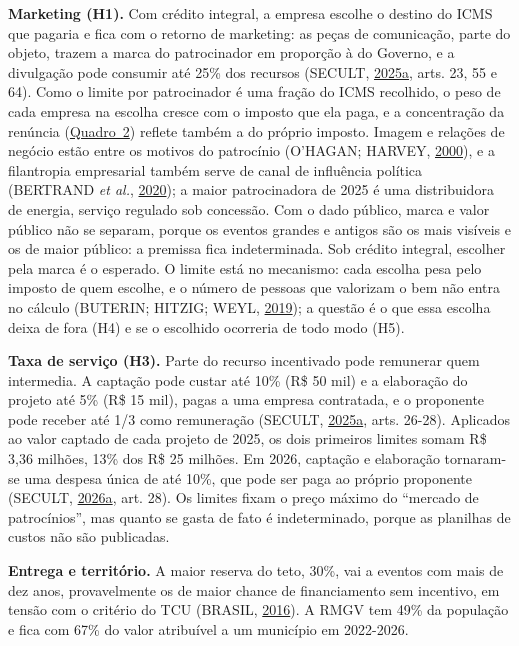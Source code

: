 \documentclass[12pt,a4paper]{article}
\begin{document}
\textbf{Marketing (H1).} Com crédito integral, a empresa escolhe o destino do ICMS que pagaria e
fica com o retorno de marketing: as peças de comunicação, parte do objeto, trazem a marca do
patrocinador em proporção à do Governo, e a divulgação pode consumir até 25\% dos recursos (SECULT,
\hyperref[ref-secult-35]{2025a}, arts. 23, 55 e 64). Como o limite por patrocinador é uma fração do
ICMS recolhido, o peso de cada empresa na escolha cresce com o imposto que ela paga, e a
concentração da renúncia (\hyperref[quadro-2]{Quadro~2}) reflete também a do próprio imposto. Imagem e relações de
negócio estão entre os motivos do patrocínio (O'HAGAN; HARVEY, \hyperref[ref-o-hagan-28]{2000}), e a
filantropia empresarial também serve de canal de influência política (BERTRAND \emph{et al.},
\hyperref[ref-bertrand-3]{2020}); a maior patrocinadora de 2025 é uma distribuidora de energia,
serviço regulado sob concessão. Com o dado público, marca e valor público não se separam, porque os
eventos grandes e antigos são os mais visíveis e os de maior público: a premissa fica indeterminada.
Sob crédito integral, escolher pela marca é o esperado. O limite está no mecanismo: cada escolha
pesa pelo imposto de quem escolhe, e o número de pessoas que valorizam o bem não entra no cálculo
(BUTERIN; HITZIG; WEYL, \hyperref[ref-buterin-7]{2019}); a questão é o que essa escolha deixa de
fora (H4) e se o escolhido ocorreria de todo modo (H5).

\textbf{Taxa de serviço (H3).} Parte do recurso incentivado pode remunerar quem intermedia. A
captação pode custar até 10\% (R\$ 50 mil) e a elaboração do projeto até 5\% (R\$ 15 mil), pagas a
uma empresa contratada, e o proponente pode receber até 1/3 como remuneração (SECULT,
\hyperref[ref-secult-35]{2025a}, arts. 26-28). Aplicados ao valor captado de cada projeto de 2025,
os dois primeiros limites somam R\$ 3,36 milhões, 13\% dos R\$ 25 milhões. Em 2026, captação e
elaboração tornaram-se uma despesa única de até 10\%, que pode ser paga ao próprio proponente
(SECULT, \hyperref[ref-secult-38]{2026a}, art. 28). Os limites fixam o preço máximo do ``mercado de
patrocínios'', mas quanto se gasta de fato é indeterminado, porque as planilhas de custos não são
publicadas.

\textbf{Entrega e território.} A maior reserva do teto, 30\%, vai a eventos com mais de dez anos,
provavelmente os de maior chance de financiamento sem incentivo, em tensão com o critério do TCU
(BRASIL, \hyperref[ref-brasil-5]{2016}). A RMGV tem 49\% da população e fica com 67\% do valor
atribuível a um município em 2022-2026.
\end{document}
